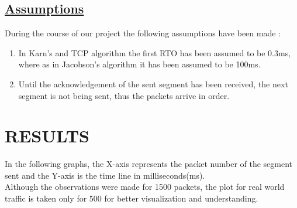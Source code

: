 \documentclass[12pt]{article}
\begin{document}
\subsection{\underline{Assumptions}}

During the course of our project the following assumptions have been made :
\begin{enumerate}
\item In Karn’s and TCP algorithm the first RTO has been assumed to be 0.3ms,                         where as in Jacobson’s algorithm it has been assumed to be 100ms.
\item Until the acknowledgement of the sent segment has been received, the next segment is not being sent, thus the packets arrive in order.\\
\end{enumerate}
\section{RESULTS}
In the following graphs, the X-axis represents the packet number of the segment sent and the Y-axis is the time line in milliseconds(ms).\\
Although the observations were made for 1500 packets, the plot for real world traffic is taken only for 500 for better visualization and understanding.
\end{document}
